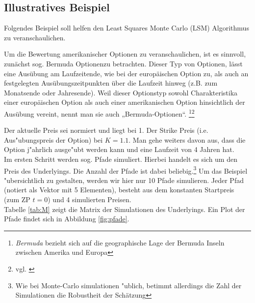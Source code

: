 \documentclass[10pt,a4paper]{article}
\begin{document}
\subsection{Illustratives Beispiel}

Folgendes Beispiel soll helfen den Least Squares Monte Carlo (LSM) Algorithmus zu veranschaulichen. 

Um die Bewertung amerikanischer Optionen zu veranschaulichen, ist es sinnvoll, zunächst sog. \glqq Bermuda Optionen\grqq zu betrachten. Dieser Typ von Optionen, lässt eine Ausübung am Laufzeitende, wie bei der europäischen Option zu, als auch an festgelegten Ausübungszeitpunkten über die Laufzeit hinweg (z.B. zum Monatsende oder Jahresende). Weil dieser Optionstyp sowohl Charakteristika einer europäischen Option als auch einer amerikanischen Option hinsichtlich der Ausübung vereint, nennt man sie auch „Bermuda-Optionen“. \footnote{\textit{Bermuda} bezieht sich auf die geographische Lage der Bermuda Inseln zwischen Amerika und Europa}\footnote{vgl. \cite{Fries}}

Der aktuelle Preis sei normiert und liegt bei 1. Der Strike Preis (i.e. Aus"ubungspreis der Option) bei $K=1.1$. Man gehe weiters davon aus, dass die Option j"ahrlich ausge"ubt werden kann und eine Laufzeit von 4 Jahren hat.\\
Im ersten Schritt werden sog. Pfade simuliert. Hierbei handelt es sich um den Preis des Underlyings. Die Anzahl der Pfade ist dabei beliebig.\footnote{Wie bei Monte-Carlo simulationen "ublich, betimmt allerdings die Zahl der Simulationen die Robustheit der Schätzung} Um das Beispiel "ubersichtlich zu gestalten, werden wir hier nur 10 Pfade simulieren. Jeder Pfad (notiert als Vektor mit 5 Elementen), besteht aus dem konstanten Startpreis (zum ZP $t=0$) und 4 simulierten Preisen.\\


Tabelle \ref{tab:M} zeigt die Matrix der Simulationen des Underlyings. Ein Plot der Pfade findet sich in Abbildung \ref{fig:pfade}.
\end{document}
